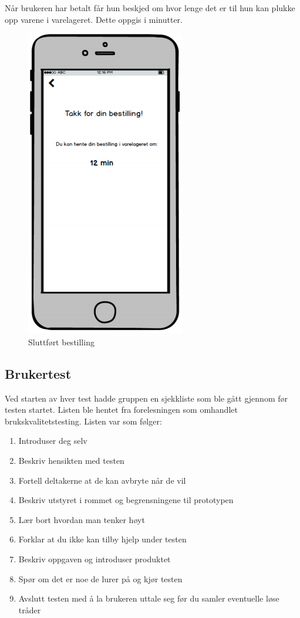 \noindent Når brukeren har betalt får hun beskjed om hvor lenge det er til hun kan plukke opp varene i varelageret. Dette oppgis i minutter.

\begin{figure}[H]
\includegraphics[scale=0.47]{images/prototype1/sluttfortbestilling}
\centering %
\caption{Sluttført bestilling}
\label{fig:sluttfortbestilling}
\end{figure}

\subsection{Brukertest}
Ved starten av hver test hadde gruppen en sjekkliste som ble gått gjennom før testen startet. Listen ble hentet fra forelesningen som omhandlet brukskvalitetstesting\cite{brukskvalitetstesting}. Listen var som følger: 

\begin{enumerate}
    \item Introduser deg selv
    \item Beskriv hensikten med testen
    \item Fortell deltakerne at de kan avbryte når de vil
    \item Beskriv utstyret i rommet og begrensningene til prototypen
    \item Lær bort hvordan man tenker høyt
    \item Forklar at du ikke kan tilby hjelp under testen
    \item Beskriv oppgaven og introduser produktet
    \item Spør om det er noe de lurer på og kjør testen
    \item Avslutt testen med å la brukeren uttale seg før du samler eventuelle løse tråder
\end{enumerate}

